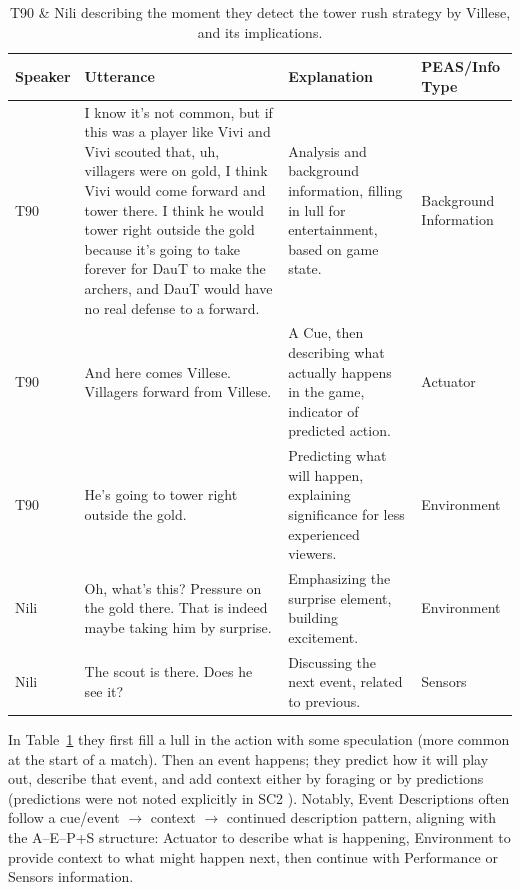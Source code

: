 \begin{table}[!htbp]
  \caption{T90 \& Nili describing the moment they detect the tower rush strategy by Villese, and its implications.}
  \label{tab:t90-nili-example-forward-tower}
  \centering
  \setlength{\tabcolsep}{4pt}
  \renewcommand{\arraystretch}{1.3}
  \begin{tabularx}{\textwidth}{@{}l>{\raggedright\arraybackslash}p{7cm}>{\raggedright\arraybackslash}p{4cm}>{\centering\arraybackslash}p{2cm}@{}}
    \toprule
    \textbf{Speaker} & \textbf{Utterance} & \textbf{Explanation} & \textbf{PEAS/Info Type} \\
    \midrule
    T90 & I know it's not common, but if this was a player like Vivi and Vivi scouted that, uh, villagers were on gold, I think Vivi would come forward and tower there. I think he would tower right outside the gold because it's going to take forever for DauT to make the archers, and DauT would have no real defense to a forward. & Analysis and background information, filling in lull for entertainment, based on game state. & Background Information \\
    T90 & And here comes Villese. Villagers forward from Villese. & A Cue, then describing what actually happens in the game, indicator of predicted action. & Actuator \\
    T90 & He's going to tower right outside the gold. & Predicting what will happen, explaining significance for less experienced viewers. & Environment \\
    Nili & Oh, what's this? Pressure on the gold there. That is indeed maybe taking him by surprise. & Emphasizing the surprise element, building excitement. & Environment \\
    Nili & The scout is there. Does he see it? & Discussing the next event, related to previous. & Sensors \\
    \bottomrule
  \end{tabularx}
\end{table}

In Table~\ref{tab:t90-nili-example-forward-tower} they first fill a lull in the action with some speculation (more common at the start of a match). Then an event happens; they predict how it will play out, describe that event, and add context either by foraging or by predictions (predictions were not noted explicitly in SC2 \cite{dodge2018}). Notably, Event Descriptions often follow a cue/event \(\rightarrow\) context \(\rightarrow\) continued description pattern, aligning with the A--E--P+S structure: Actuator to describe what is happening, Environment to provide context to what might happen next, then continue with Performance or Sensors information.

